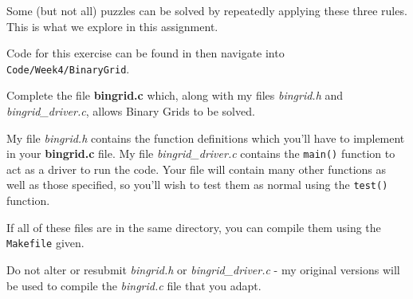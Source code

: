 \noindent Some (but not all) puzzles can be solved by repeatedly applying these three rules.
This is what we explore in this assignment.

\begin{exercise}

Code for this exercise can be found in 
\noindent then navigate into \verb^Code/Week4/BinaryGrid^.

Complete the file {\bf bingrid.c} which, along with my files {\em
bingrid.h} and {\em bingrid\_driver.c}, allows Binary Grids to be solved.

\noindent My file {\em bingrid.h} contains the function definitions
which you'll have to implement in your {\bf bingrid.c} file.  My file
{\em bingrid\_driver.c} contains the \verb^main()^ function to act as
a driver to run the code.  Your file will contain many other functions
as well as those specified, so you'll wish to test them as normal using
the \verb^test()^ function.

\noindent If all of these files are in the same directory, you can
compile them using the \verb^Makefile^ given.

\noindent Do not alter or resubmit {\em bingrid.h} or {\em
bingrid\_driver.c} - my original versions will be used to compile the
{\em bingrid.c} file that you adapt.

\end{exercise}
